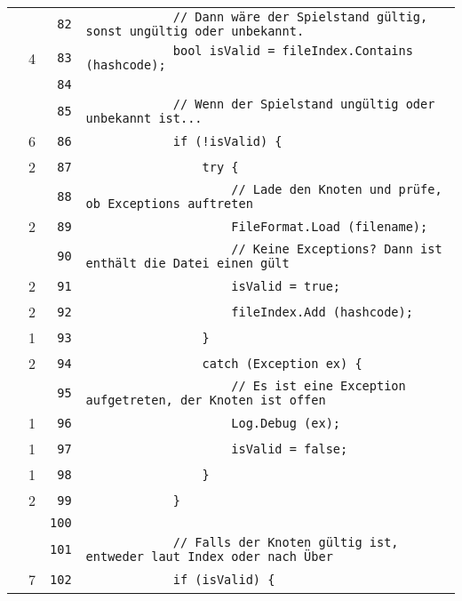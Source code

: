 \documentclass[a4paper,10pt]{article}
\begin{document}
\begin{longtable}[l]{lrrl}
\cellcolor{gray} &  & \verb~82~ & \verb~            // Dann wäre der Spielstand gültig, sonst ungültig oder unbekannt.~\\
\cellcolor{green} & 4 & \verb~83~ & \verb~            bool isValid = fileIndex.Contains (hashcode);~\\
\cellcolor{gray} &  & \verb~84~ & \verb~~\\
\cellcolor{gray} &  & \verb~85~ & \verb~            // Wenn der Spielstand ungültig oder unbekannt ist...~\\
\cellcolor{green} & 6 & \verb~86~ & \verb~            if (!isValid) {~\\
\cellcolor{green} & 2 & \verb~87~ & \verb~                try {~\\
\cellcolor{gray} &  & \verb~88~ & \verb~                    // Lade den Knoten und prüfe, ob Exceptions auftreten~\\
\cellcolor{green} & 2 & \verb~89~ & \verb~                    FileFormat.Load (filename);~\\
\cellcolor{gray} &  & \verb~90~ & \verb~                    // Keine Exceptions? Dann ist enthält die Datei einen gült~\\
\cellcolor{green} & 2 & \verb~91~ & \verb~                    isValid = true;~\\
\cellcolor{green} & 2 & \verb~92~ & \verb~                    fileIndex.Add (hashcode);~\\
\cellcolor{green} & 1 & \verb~93~ & \verb~                }~\\
\cellcolor{green} & 2 & \verb~94~ & \verb~                catch (Exception ex) {~\\
\cellcolor{gray} &  & \verb~95~ & \verb~                    // Es ist eine Exception aufgetreten, der Knoten ist offen~\\
\cellcolor{green} & 1 & \verb~96~ & \verb~                    Log.Debug (ex);~\\
\cellcolor{green} & 1 & \verb~97~ & \verb~                    isValid = false;~\\
\cellcolor{green} & 1 & \verb~98~ & \verb~                }~\\
\cellcolor{green} & 2 & \verb~99~ & \verb~            }~\\
\cellcolor{gray} &  & \verb~100~ & \verb~~\\
\cellcolor{gray} &  & \verb~101~ & \verb~            // Falls der Knoten gültig ist, entweder laut Index oder nach Über~\\
\cellcolor{green} & 7 & \verb~102~ & \verb~            if (isValid) {~\\

\end{longtable}
\end{document}
